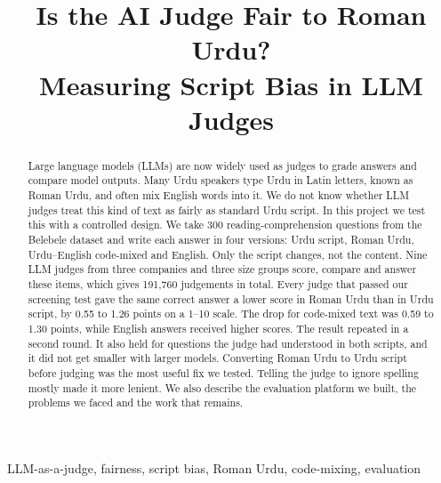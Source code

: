 \documentclass[conference]{IEEEtran}
\begin{document}
\title{Is the AI Judge Fair to Roman Urdu?\\ Measuring Script Bias in LLM Judges}

\author{
}

\maketitle

\begin{abstract}
Large language models (LLMs) are now widely used as judges to grade answers and compare model outputs. Many Urdu
speakers type Urdu in Latin letters, known as Roman Urdu, and often mix English words into it. We do not know whether
LLM judges treat this kind of text as fairly as standard Urdu script. In this project we test this with a controlled
design. We take 300 reading-comprehension questions from the Belebele dataset and write each answer in four versions:
Urdu script, Roman Urdu, Urdu--English code-mixed and English. Only the script changes, not the content. Nine LLM judges
from three companies and three size groups score, compare and answer these items, which gives 191{,}760 judgements in
total. Every judge that passed our screening test gave the same correct answer a lower score in Roman Urdu than in Urdu
script, by 0.55 to 1.26 points on a 1--10 scale. The drop for code-mixed text was 0.59 to 1.30 points, while English
answers received higher scores. The result repeated in a second round. It also held for questions the judge had
understood in both scripts, and it did not get smaller with larger models. Converting Roman Urdu to Urdu script before
judging was the most useful fix we tested. Telling the judge to ignore spelling mostly made it more lenient. We also
describe the evaluation platform we built, the problems we faced and the work that remains.
\end{abstract}

\begin{IEEEkeywords}
LLM-as-a-judge, fairness, script bias, Roman Urdu, code-mixing, evaluation
\end{IEEEkeywords}

\end{document}
